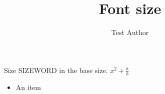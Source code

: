 \documentclass[aspectratio=169,8pt]{beamer}
\title{Font size}
\author{Test Author}
\begin{document}
\begin{frame}{Size}
	SIZEWORD in the base size. $x^2 + \frac{a}{b}$
	\begin{itemize}
		\item An item
	\end{itemize}
\end{frame}
\end{document}
